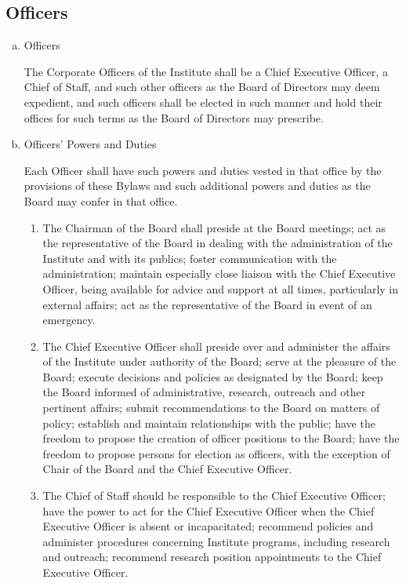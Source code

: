 \subsection{Officers}

\begin{enumerate}[(a)]
\item Officers

The Corporate Officers of the Institute shall be a Chief Executive Officer, a Chief of Staff, and such other officers as the Board of Directors may deem expedient, and such officers shall be elected in such manner and hold their offices for such terms as the Board of Directors may prescribe.

\item Officers' Powers and Duties

Each Officer shall have such powers and duties vested in that office by the provisions of these Bylaws and such additional powers and duties as the Board may confer in that office.

\begin{enumerate}
\item The Chairman of the Board shall preside at the Board meetings; act as the representative of the Board in dealing with the administration of the Institute and with its publics; foster communication with the administration; maintain especially close liaison with the Chief Executive Officer, being available for advice and support at all times, particularly in external affairs; act as the representative of the Board in event of an emergency.

\item The Chief Executive Officer shall preside over and administer the affairs of the Institute under authority of the Board; serve at the pleasure of the Board; execute decisions and policies as designated by the Board; keep the Board informed of administrative, research, outreach and other pertinent affairs; submit recommendations to the Board on matters of policy; establish and maintain relationships with the public; have the freedom to propose the creation of officer positions to the Board; have the freedom to propose persons for election as officers, with the exception of Chair of the Board and the Chief Executive Officer. 

\item The Chief of Staff should be responsible to the Chief Executive Officer; have the power to act for the Chief Executive Officer when the Chief Executive Officer is absent or incapacitated; recommend policies and administer procedures concerning Institute programs, including research and outreach; recommend research position appointments to the Chief Executive Officer.
\end{enumerate}



\end{enumerate}

